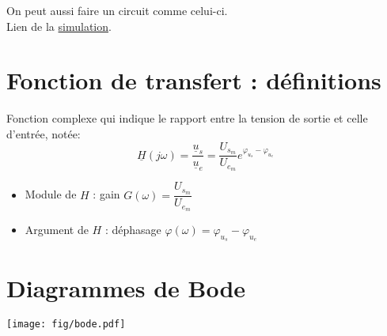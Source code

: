 \documentclass{article}
\begin{document}
{        On peut aussi faire un circuit comme celui-ci.\\
        Lien de la \href{https://www.falstad.com/circuit/circuitjs.html?ctz=CQAgjCAMB0l3BWcBOaAOAbAdgCwCYsBmHMBMHZNQkBSGmuhAUwFowwAoANxB0LxB4EGXv15gRdCLUZQ5MBBwBOogUJEIsI9XLyQOAdxpbxIvgJKTDqwcJCE0OW1aPnT9x+-0APQWjQoSFgI1GCUvOAiAIIAOgDOMgASAF7xAPYAdvEADkwArgAu8VxpAJZK8QCOeUzxADYAhvEFTBlxpZnxACa1cXFpSgWlvUxxRXENBQUAlxl5070AFHN1dUwAlNAcviQBpE4YEuCaEXhOAGKldQVKvQDGaXm58QBGDRk92350xNSEWD8cGZBE4AGrxVo3BZfbBOYhBBBIYgBJxnEDgvoDIZMDh3YzaOyaESEQjAmDwSAQFgIWC7QjIM7IMAkkhQWCUqAcOr4+yknmWeSwCAwMIksBYTA4HBEAFoSABfRGInOEAYNE6RX8o5qpwC-QqHUqw168BwayGnTYNR2TXG7VYCxHfRpOQK3iQcJgOjkoRyULUKR-DhAA}{simulation}.

    }    
    
    \section{Fonction de transfert : définitions}

    Fonction complexe qui indique le rapport entre la tension de sortie et celle d'entrée, notée: 
    $$\underline{H}(j\omega) = \dfrac{\underline{u}_s}{\underline{u}_e} = \dfrac{U_{s_m}}{U_{e_m}} e^{\varphi_{u_s} - \varphi_{u_e}}$$

    \begin{itemize}[label=$\ast$]
        \item Module de $H$ : gain $G(\omega) = \dfrac{U_{s_m}}{U_{e_m}}$
        \item Argument de $H$ : déphasage $\varphi(\omega) = \varphi_{u_s} - \varphi_{u_e}$
    \end{itemize}



    \section{Diagrammes de Bode}

    \texttt{[image: fig/bode.pdf]}
\end{document}
